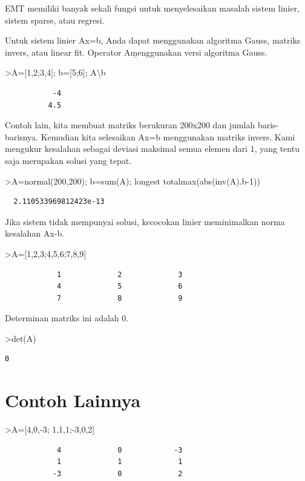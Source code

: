 \documentclass[
]{book}
\begin{document}
EMT memiliki banyak sekali fungsi untuk menyelesaikan masalah sistem linier, sistem sparse, atau regresi.

Untuk sistem linier Ax=b, Anda dapat menggunakan algoritma Gauss, matriks invers, atau linear fit. Operator A\b menggunakan versi algoritma Gauss.

\textgreater A={[}1,2;3,4{]}; b={[}5;6{]}; A\textbackslash b

\begin{verbatim}
           -4 
          4.5 
\end{verbatim}

Contoh lain, kita membuat matriks berukuran 200x200 dan jumlah baris-barisnya. Kemudian kita selesaikan Ax=b menggunakan matriks invers. Kami mengukur kesalahan sebagai deviasi maksimal semua elemen dari 1, yang tentu saja merupakan solusi yang tepat.

\textgreater A=normal(200,200); b=sum(A); longest totalmax(abs(inv(A).b-1))

\begin{verbatim}
  2.110533969812423e-13 
\end{verbatim}

Jika sistem tidak mempunyai solusi, kecocokan linier meminimalkan norma kesalahan Ax-b.

\textgreater A={[}1,2,3;4,5,6;7,8,9{]}

\begin{verbatim}
            1             2             3 
            4             5             6 
            7             8             9 
\end{verbatim}

Determinan matriks ini adalah 0.

\textgreater det(A)

\begin{verbatim}
0
\end{verbatim}

\chapter{Contoh Lainnya}\label{contoh-lainnya-15}

\textgreater A={[}4,0,-3; 1,1,1;-3,0,2{]}

\begin{verbatim}
            4             0            -3 
            1             1             1 
           -3             0             2 
\end{verbatim}
\end{document}
